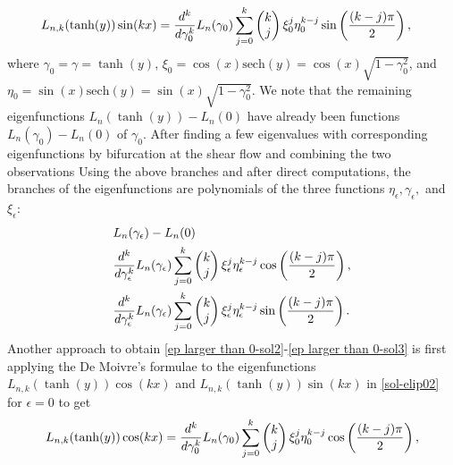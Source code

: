 \documentclass[1 [leqno, 11pt]{amsart}
\numberwithin{equation}{section}
\let\ep=\epsilon
\begin{document}
\begin{CJK*}{GBK}{song}
\begin{align}
 &L_{n,k}(\tanh(y))\sin(kx)=
 {d^k\over d\gamma_0^k}L_n(\gamma_0)
 \sum_{j=0}^k\begin{pmatrix}k\\j\end{pmatrix}\xi_0^j\eta_0^{k-j}\sin\left({(k-j)\pi\over2}\right),
\end{align}
where $\gamma_0=\gamma=\tanh(y)$,  $\xi_0=\cos(x)\text{sech}(y)=\cos(x)\sqrt{1-\gamma_0^2}$, and $\eta_0=\sin(x)\text{sech}(y)=\sin(x)\sqrt{1-\gamma_0^2}$.
We note that the remaining eigenfunctions  $L_{n}(\tanh(y))-L_{n}(0)$ have already been functions $L_{n}(\gamma_0)-L_{n}(0)$ of $\gamma_0$.
\fi
After finding a few eigenvalues with corresponding  eigenfunctions by  bifurcation at the shear flow and combining the two observations
\fi
Using the above branches and after direct computations, the branches of  the eigenfunctions
are  polynomials of the three functions  $
\eta_\epsilon,
\gamma_\epsilon,$ and $
\xi_\epsilon$:
\begin{align}\label{ep larger than 0-sol1}
&L_{n}(\gamma_\epsilon)-L_{n}(0)\\\label{ep larger than 0-sol2}
 &{d^k\over d\gamma_\ep^k}L_n(\gamma_\ep)
 \sum_{j=0}^k\begin{pmatrix}k\\j\end{pmatrix}\xi_\ep^j\eta_\ep^{k-j}\cos\left({(k-j)\pi\over2}\right),\\\label{ep larger than 0-sol3}
 &{d^k\over d\gamma_\ep^k}L_n(\gamma_\ep)
 \sum_{j=0}^k\begin{pmatrix}k\\j\end{pmatrix}\xi_\ep^j\eta_\ep^{k-j}\sin\left({(k-j)\pi\over2}\right).
\end{align}
Another approach to obtain \eqref{ep larger than 0-sol2}-\eqref{ep larger than 0-sol3} is first applying the De Moivre's formulae to the eigenfunctions  $L_{n,k}(\tanh(y))\cos(kx)$  and $L_{n,k}(\tanh(y))\sin(kx)$   in \eqref{sol-elip02} for $\ep=0$ to get
\begin{align}\label{ep=0-cos}
 &L_{n,k}(\tanh(y))\cos(kx)
 ={d^k\over d\gamma_0^k}L_n(\gamma_0)
 \sum_{j=0}^k\begin{pmatrix}k\\j\end{pmatrix}\xi_0^j\eta_0^{k-j}\cos\left({(k-j)\pi\over2}\right),\\\label{ep=0-sin}

\end{align}
\end{CJK*}
\end{document}
